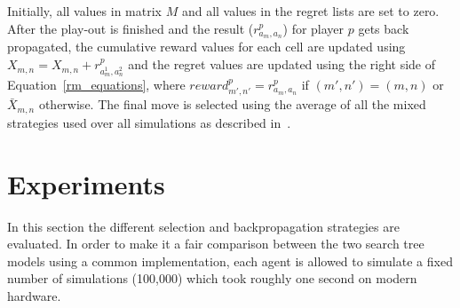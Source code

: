 \documentclass{article}
\begin{document}

Initially, all values in matrix $M$ and all values in the regret lists are set to zero. After the play-out is finished and the result ($r^{p}_{a_{m},a_{n}}$) for player $p$ gets back propagated, the cumulative reward values for each cell are updated using $X_{m,n} = X_{m,n} + r^{p}_{a^{1}_{m},a^{2}_{n}}$ and the regret values are updated using the right side of Equation~\ref{rm_equations},
where $reward^p_{m',n'} = r^p_{a_m,a_n}$ if $(m',n') = (m,n)$ or $\bar{X}_{m,n}$ otherwise.
The final move is selected using the average of all the mixed strategies used over all simulations as described in~\cite{mcts_goofspiel}. 




\section{Experiments}
\label{sec:experiments}

In this section the different selection and backpropagation strategies are evaluated. 
In order to make it a fair comparison between the two search tree models using a common implementation, each agent is allowed to simulate a fixed number of simulations (100,000) which took roughly one second on modern hardware. 
\end{document}
